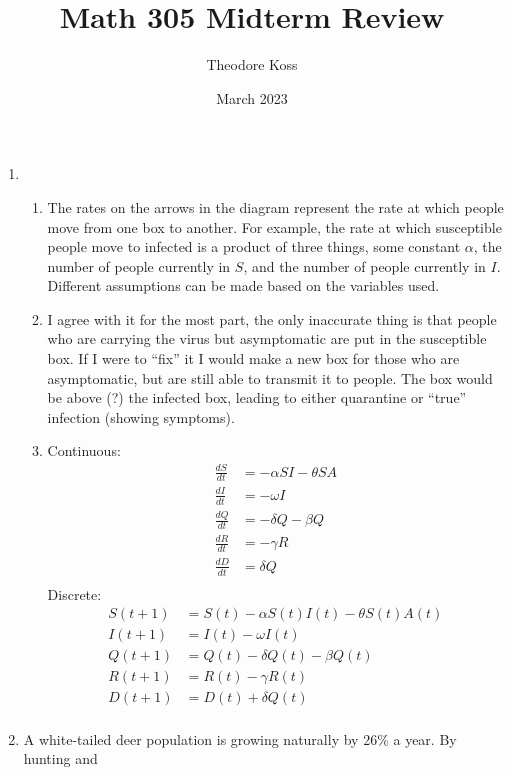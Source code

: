 \documentclass{article}
\title{Math 305 Midterm Review}
\author{Theodore Koss}
\date{March 2023}
\begin{document}
\maketitle

\begin{enumerate}
    \item \begin{enumerate}
        \item The rates on the arrows in the diagram represent the rate at which people move from one box to another. For example, the rate at which susceptible people move to infected is a product of three things, some constant $\alpha$, the number of people currently in $S$, and the number of people currently in $I$. Different assumptions can be made based on the variables used. 
        \item I agree with it for the most part, the only inaccurate thing is that people who are carrying the virus but asymptomatic are put in the susceptible box. If I were to ``fix'' it I would make a new box for those who are asymptomatic, but are still able to transmit it to people. The box would be above (?) the infected box, leading to either quarantine or ``true'' infection (showing symptoms).
        \item Continuous:\begin{align*}
            \frac{dS}{dt}&=-\alpha SI-\theta SA\\
            \frac{dI}{dt}&=-\omega I\\
            \frac{dQ}{dt}&=-\delta Q-\beta Q\\
            \frac{dR}{dt}&=-\gamma R\\
            \frac{dD}{dt}&=\delta Q\\
        \end{align*}
        Discrete:
        \begin{align*}
            S(t+1)&=S(t)-\alpha S(t)I(t)-\theta S(t)A(t)\\
            I(t+1)&=I(t)-\omega I(t)\\
            Q(t+1)&=Q(t)-\delta Q(t)-\beta Q(t)\\
            R(t+1)&=R(t)-\gamma R(t)\\
            D(t+1)&=D(t)+\delta Q(t)\\
        \end{align*}
    \end{enumerate}
    \item A white-tailed deer population is growing naturally by 26\% a year. By hunting and

\end{enumerate}
\end{document}
